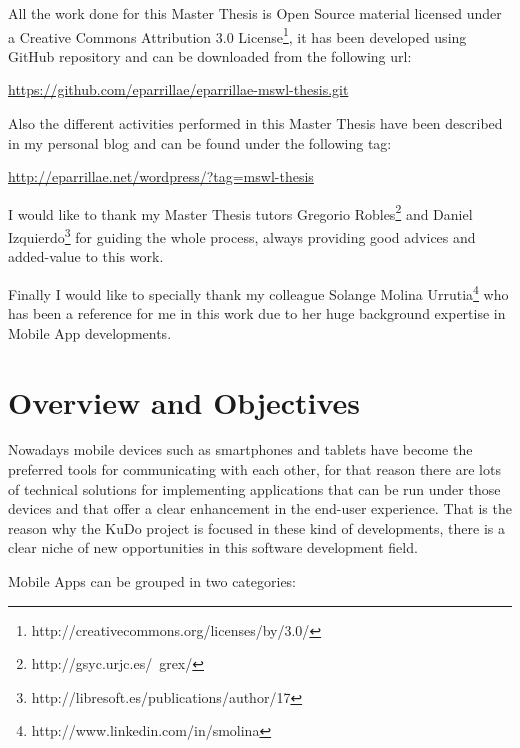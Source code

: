 \documentclass[a4paper,12pt]{book}
\begin{document}
All the work done for this Master Thesis is Open Source material licensed under a Creative Commons Attribution 3.0 License\footnote{http://creativecommons.org/licenses/by/3.0/}, it has been developed using GitHub repository and can be downloaded from the following url:

\url{
https://github.com/eparrillae/eparrillae-mswl-thesis.git}


Also the different activities performed in this Master Thesis have been described in my personal blog and can be found under the following tag:

\url{
http://eparrillae.net/wordpress/?tag=mswl-thesis}


I would like to thank my Master Thesis tutors Gregorio Robles\footnote{http://gsyc.urjc.es/~grex/}  and Daniel Izquierdo\footnote{http://libresoft.es/publications/author/17} for guiding the whole process, always providing good advices and added-value to this work.


Finally I would like to specially thank my colleague Solange Molina Urrutia\footnote{http://www.linkedin.com/in/smolina} who has been a reference for me in this work due to her huge background expertise in Mobile App developments.  


\chapter{Overview and Objectives}
\label{chap:overview}

Nowadays mobile devices such as smartphones and tablets have become the preferred tools for communicating with each other, for that reason there are lots of technical solutions for implementing applications that can be run under those devices and that offer a clear enhancement in the end-user experience. That is the reason why the KuDo project is focused in these kind of developments, there is a clear niche of new opportunities in this software development field.

Mobile Apps can be grouped in two categories:
\end{document}
